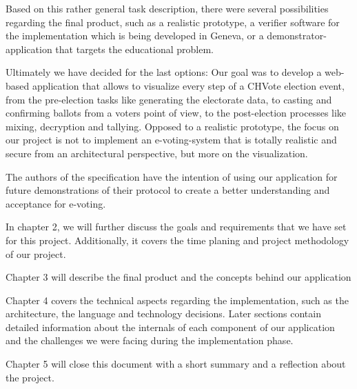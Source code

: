 Based on this rather general task description, there were several possibilities regarding the final product, such as a realistic prototype, a verifier software for the implementation which is being developed in Geneva, or a demonstrator-application that targets the educational problem. 

Ultimately we have decided for the last options: Our goal was to develop a web-based application that allows to visualize every step of a CHVote election event, from the pre-election tasks like generating the electorate data, to casting and confirming ballots from a voters point of view, to the post-election processes like mixing, decryption and tallying. Opposed to a realistic prototype, the focus on our project is not to implement an e-voting-system that is totally realistic and secure from an architectural perspective, but more on the visualization.  

The authors of the specification have the intention of using our application for future demonstrations of their protocol to create a better understanding and acceptance for e-voting.

In chapter 2, we will further discuss the goals and requirements that we have set for this project. Additionally, it covers the time planing and project methodology of our project.

Chapter 3 will describe the final product and the concepts behind our application

Chapter 4 covers the technical aspects regarding the implementation, such as the architecture, the language and technology decisions. Later sections contain detailed information about the internals of each component of our application and the challenges we were facing during the implementation phase. 

Chapter 5 will close this document with a short summary and a reflection about the project.